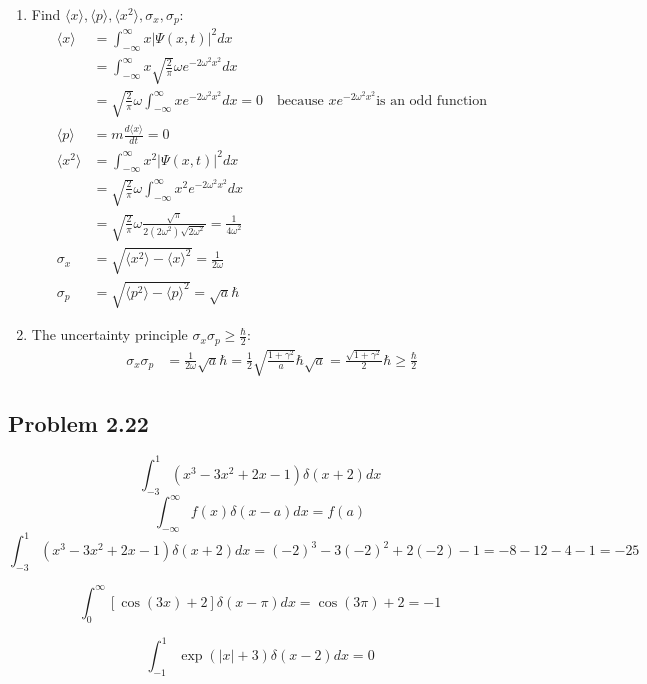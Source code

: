 \documentclass{article}
\begin{document}
\begin{enumerate}[label=(\alph*)]
\begin{figure}[H]
	      \end{figure}
	\item Find \(\langle x \rangle, \langle p \rangle, \langle x^2 \rangle, \sigma_x, \sigma_p: \)
	\begin{align*}
		\langle x \rangle &= \int_{-\infty}^{\infty} x |\Psi(x,t)|^2 dx \\
		& = \int_{-\infty}^{\infty} x \sqrt{\frac{2}{\pi}} \omega e^{-2 \omega^2 x^2} dx \\
		&= \sqrt{\frac{2}{\pi}} \omega \int_{-\infty}^{\infty} x e^{-2 \omega^2 x^2} dx = 0 \quad \text{because }x e^{-2 \omega^2 x^2} \text{is an odd function}\\
		\langle p \rangle &= m \frac{d \langle x \rangle}{dt} = 0 \\
		\langle x^2 \rangle &= \int_{-\infty}^{\infty} x^2 |\Psi(x,t)|^2 dx \\
		& = \sqrt{\frac{2}{\pi}} \omega \int_{-\infty}^{\infty} x^2   e^{-2 \omega^2 x^2} dx \\
		&= \sqrt{\frac{2}{\pi}} \omega \frac{\sqrt{\pi}}{2(2 \omega^2)\sqrt{2 \omega^2}} = \frac{1}{4 \omega^2} \\
		\sigma_x &= \sqrt{\langle x^2 \rangle - \langle x \rangle^2} = \frac{1}{2 \omega} \\
		\sigma_p &= \sqrt{\langle p^2 \rangle - \langle p \rangle^2} = \sqrt{a} \hbar
	\end{align*}
	\item The uncertainty principle \(\sigma_x \sigma_p \geq \frac{\hbar}{2}\):
	\begin{align*}
		\sigma_x \sigma_p &= \frac{1}{2 \omega} \sqrt{a} \hbar = \frac{1}{2} \sqrt{\frac{1+\gamma^2}{a}} \hbar \sqrt{a} = \frac{\sqrt{1+\gamma^2}}{2} \hbar \geq \frac{\hbar}{2}
	\end{align*}
\end{enumerate}
\subsection*{Problem 2.22}
\[\int_{-3}^{1} (x^3 - 3x^2 + 2x - 1) \delta(x+2) dx\]
\[\int_{-\infty}^{\infty} f(x) \delta(x-a) dx = f(a) \]
\[\int_{-3}^{1} (x^3 - 3x^2 + 2x - 1) \delta(x+2) dx = (-2)^3 - 3(-2)^2 + 2(-2) - 1 = -8 - 12 - 4 - 1 = -25\]

\[\int_{0}^{\infty} \left[\cos(3x) + 2 \right]  \delta(x - \pi) dx = \cos(3 \pi) + 2 = -1\]

\[\int_{-1}^{1} \exp(|x| + 3) \delta(x-2) dx = 0\]
\end{document}
